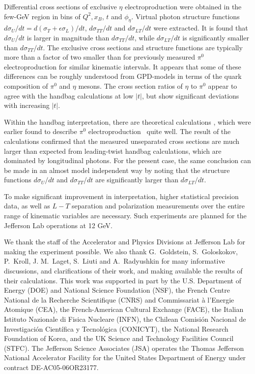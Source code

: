 \documentclass[prc,aps,floatfix,showpacs,showkeys,twocolumn,superscriptaddress,letterpaper,10pt]{revtex4-1}
\begin{document}
Differential cross sections of exclusive $\eta$ electroproduction were  obtained in the few-GeV region in  bins of $Q^2, x_B$, $t$ and $\phi_\eta$.  
Virtual photon structure functions  $d\sigma_U/dt=d(\sigma_T+\epsilon\sigma_L)/dt$, $d\sigma_{TT}/dt$ and $d\sigma_{LT}/dt$ were  extracted. It is found that $d\sigma_U/dt$  is larger in magnitude than $d\sigma_{TT}/dt$,  while $d\sigma_{LT}/dt$ is significantly smaller than $d\sigma_{TT}/dt$. The exclusive cross sections and structure functions are typically more than a factor of two smaller than for previously measured $\pi^0$ electroproduction for similar kinematic intervals. 
It appears that some of these differences can be roughly understood from GPD-models in terms of the quark composition of $\pi^0$ and $\eta$ mesons.
The cross section ratios of $\eta$ to $\pi^0$  appear to agree with the handbag calculations at low $|t|$, but show  significant deviations with increasing $|t|$.



 
Within the handbag interpretation, there are  theoretical calculations \cite{ Goloskokov:2011rd}, which were earlier found to describe  $\pi^0$ electroproduction~\cite{Bedlinskiy:2014tvi} quite well.  The result  of the calculations confirmed that the  measured unseparated cross sections are much larger than expected from leading-twist handbag calculations, which are dominated by longitudinal photons. For the present case,  the  same conclusion can be made in an almost model independent way by noting that the structure functions $d\sigma_U/dt$ and $d\sigma_{TT}/dt$ are  significantly larger than $d\sigma_{LT}/dt$.

To make significant improvement in interpretation, higher statistical precision data, as well as $L-T$ separation and polarization measurements over the entire range of kinematic variables are necessary. Such experiments are planned for the  Jefferson Lab operations at 12 GeV.

\begin{acknowledgments}
We thank  the staff of the Accelerator and Physics Divisions at Jefferson Lab for making the experiment possible. We also thank 
G.~Goldstein, 
S.~Goloskokov, 
P.~Kroll, 
J. M.~Laget, 
S.~Liuti and 
A.~Radyushkin 
for many informative discussions,  and clarifications of their work, and making available the results of their calculations. 
This work was supported in part by 
the U.S. Department of Energy (DOE) and National Science Foundation (NSF), 
the French Centre National de la Recherche Scientifique (CNRS) and Commissariat  \`a l'Energie Atomique (CEA), the French-American Cultural Exchange (FACE),
the Italian Istituto Nazionale di Fisica Nucleare (INFN), 
the Chilean Comisi\'on Nacional de Investigaci\'on Cient\'ifica y Tecnol\'ogica (CONICYT),
the National Research Foundation of Korea, 
and the UK Science and Technology Facilities
Council (STFC).
The Jefferson Science Associates (JSA) operates the Thomas Jefferson National Accelerator Facility for 
the United States Department of Energy under contract DE-AC05-06OR23177. 
\end{acknowledgments}
\end{document}
